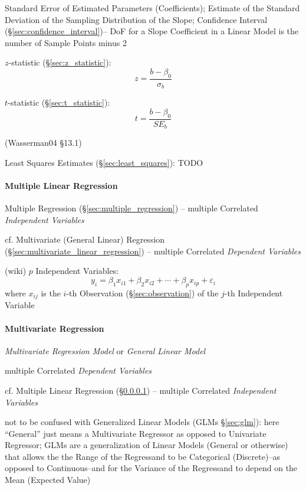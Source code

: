 Standard Error of Estimated Parameters (Coefficients); Estimate of the Standard
Deviation of the Sampling Distribution of the Slope; Confidence Interval
(\S\ref{sec:confidence_interval})-- DoF for a Slope Coefficient in a Linear
Model is the number of Sample Points minus 2

$z$-statistic (\S\ref{sec:z_statistic}):
\[
  z = \frac{b - \beta_0}{\sigma_b}
\]

$t$-statistic (\S\ref{sec:t_statistic}):
\[
  t = \frac{b - \beta_0}{SE_b}
\]

\asterism

(Wasserman04 \S13.1)

Least Squares Estimates (\S\ref{sec:least_squares}): TODO



\paragraph{Multiple Linear Regression}
\label{sec:multiple_linear_regression}\hfill

Multiple Regression (\S\ref{sec:multiple_regression}) --
multiple Correlated \emph{Independent Variables}

cf. Multivariate (General Linear) Regression
(\S\ref{sec:multivariate_linear_regression}) -- multiple Correlated
\emph{Dependent Variables}

(wiki) $p$ Independent Variables:
\[
  y_i = \beta_1 x_{i1} + \beta_2 x_{i2} + \cdots + \beta_p x_{ip} +
    \varepsilon_i
\]
where $x_{ij}$ is the $i$-th Observation (\S\ref{sec:observation}) of the $j$-th
Independent Variable



\paragraph{Multivariate Regression}
\label{sec:multivariate_regression}\hfill

\emph{Multivariate Regression Model} or \emph{General Linear Model}

multiple Correlated \emph{Dependent Variables}

cf. Multiple Linear Regression (\S\ref{sec:multiple_linear_regression})
-- multiple Correlated \emph{Independent Variables}

\fist not to be confused with Generalized Linear Models (GLMs \S\ref{sec:glm}):
here ``General'' just means a Multivariate Regressor as opposed to Univariate
Regressor; GLMs are a generalization of Linear Models (General or otherwise)
that allows the the Range of the Regressand to be Categorical (Discrete)--as
opposed to Continuous--and for the Variance of the Regressand to depend on the
Mean (Expected Value)

